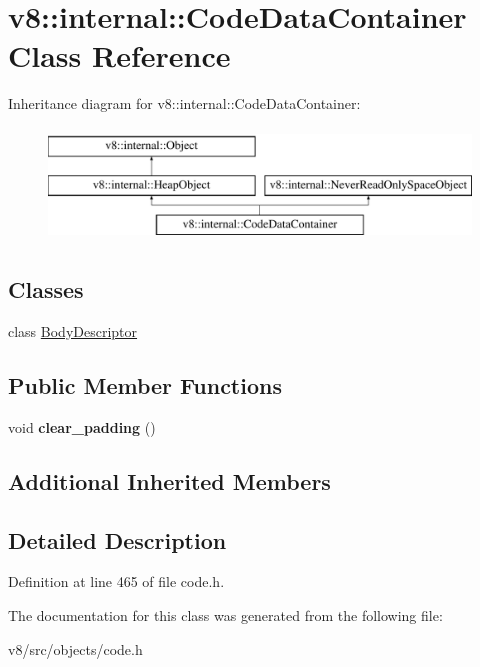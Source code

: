\hypertarget{classv8_1_1internal_1_1CodeDataContainer}{}\section{v8\+:\+:internal\+:\+:Code\+Data\+Container Class Reference}
\label{classv8_1_1internal_1_1CodeDataContainer}
Inheritance diagram for v8\+:\+:internal\+:\+:Code\+Data\+Container\+:\begin{figure}[H]
\begin{center}
\leavevmode
\includegraphics[height=3.000000cm]{classv8_1_1internal_1_1CodeDataContainer}
\end{center}
\end{figure}
\subsection*{Classes}
\begin{DoxyCompactItemize}
\item 
class \mbox{\hyperlink{classv8_1_1internal_1_1CodeDataContainer_1_1BodyDescriptor}{Body\+Descriptor}}
\end{DoxyCompactItemize}
\subsection*{Public Member Functions}
\begin{DoxyCompactItemize}
\item 
\mbox{\label{classv8_1_1internal_1_1CodeDataContainer_a25e3d7cf480b97a2ceca6d4ae9d446bf}} 
void {\bfseries clear\+\_\+padding} ()
\end{DoxyCompactItemize}
\subsection*{Additional Inherited Members}


\subsection{Detailed Description}


Definition at line 465 of file code.\+h.



The documentation for this class was generated from the following file\+:\begin{DoxyCompactItemize}
\item 
v8/src/objects/code.\+h\end{DoxyCompactItemize}
